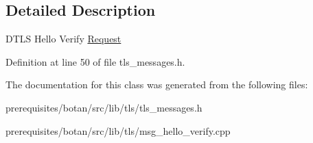 \subsection{Detailed Description}
D\+T\+LS Hello Verify \mbox{\hyperlink{struct_request}{Request}} 

Definition at line 50 of file tls\+\_\+messages.\+h.



The documentation for this class was generated from the following files\+:\begin{DoxyCompactItemize}
\item 
prerequisites/botan/src/lib/tls/tls\+\_\+messages.\+h\item 
prerequisites/botan/src/lib/tls/msg\+\_\+hello\+\_\+verify.\+cpp\end{DoxyCompactItemize}
